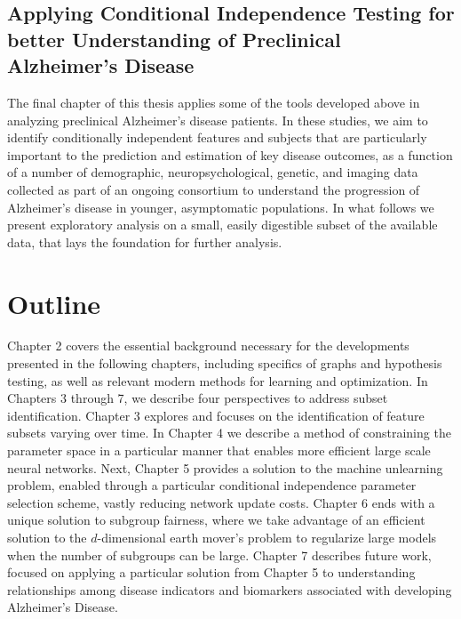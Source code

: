 {\color{red}
\subsection{Applying Conditional Independence Testing for better Understanding of Preclinical Alzheimer's Disease}

The final chapter of this thesis applies some of the tools developed above in analyzing preclinical Alzheimer's disease patients. 
In these studies, 
we aim to identify conditionally independent features and subjects that are particularly important to the prediction and estimation of
key disease outcomes,
as a function of a number 
of demographic, neuropsychological,
genetic,
and imaging data collected as 
part of an ongoing consortium 
to understand the progression
of Alzheimer's disease in younger, 
asymptomatic populations.
In what follows we present
exploratory analysis
on a small, easily 
digestible subset of the available data,
that lays the foundation for
further analysis.
}

\section{Outline}
Chapter 2 covers the essential background necessary for the developments presented in the following chapters, including specifics of graphs and hypothesis testing, as well as relevant modern methods for learning and optimization.
In Chapters 3 through 7, we describe four perspectives to address subset identification.
Chapter 3 explores and focuses on the identification of feature subsets varying over time.
In Chapter 4 we describe a method of constraining the parameter space in a particular manner
that enables more efficient large scale neural networks.
Next, Chapter 5 provides a solution to the machine unlearning problem,
enabled through a particular conditional independence parameter selection scheme, vastly reducing network update costs.
Chapter 6 ends with a unique solution to subgroup fairness, 
where we take advantage of an efficient solution to
the $d$-dimensional earth mover's problem
to regularize large models when the number of subgroups can be large.
{\color{red} Chapter 7 describes future work, focused on applying a particular solution from Chapter 5 to understanding relationships among
disease indicators and biomarkers associated with developing Alzheimer's Disease.}